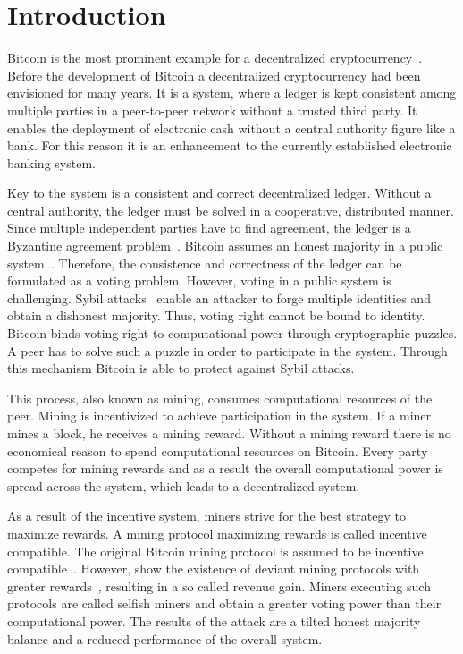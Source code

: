 \chapter{Introduction}\label{chap:introduction}
Bitcoin is the most prominent example for a decentralized cryptocurrency~\cite{1}. Before the development of Bitcoin a decentralized cryptocurrency had been envisioned for many years. It is a system, where a ledger is kept consistent among multiple parties in a peer-to-peer network without a trusted third party. It enables the deployment of electronic cash without a central authority figure like a bank.
For this reason it is an enhancement to the currently established electronic banking system.

Key to the system is a consistent and correct decentralized ledger. Without a central authority, the ledger must be solved in a cooperative, distributed manner.
Since multiple independent parties have to find agreement, the ledger is a Byzantine agreement problem~\cite{garay2015bitcoin}.
Bitcoin assumes an honest majority in a public system~\cite{tschorsch}. Therefore, the consistence and correctness of the ledger can be formulated as a voting problem. However, voting in a public system is challenging. Sybil attacks~\cite{sybil} enable an attacker to forge multiple identities and obtain a dishonest majority. Thus, voting right cannot be bound to identity. Bitcoin binds voting right to computational power through cryptographic puzzles. A peer has to solve such a puzzle in order to participate in the system. Through this mechanism Bitcoin is able to protect against Sybil attacks.

This process, also known as mining, consumes computational resources of the peer. Mining is incentivized to achieve participation in the system. If a miner mines a block, he receives a mining reward. Without a mining reward there is no economical reason to spend computational resources on Bitcoin. Every party competes for mining rewards and as a result the overall computational power is spread across the system, which leads to a decentralized system. 

As a result of the incentive system, miners strive for the best strategy to maximize rewards. A mining protocol maximizing rewards is called incentive compatible.  The original Bitcoin mining protocol is assumed to be incentive compatible~\cite{1}. However, \citeauthor{eyal} show the existence of deviant mining protocols with greater rewards~\cite{eyal}, resulting in a so called revenue gain. Miners executing such protocols are called selfish miners and obtain a greater voting power than their computational power. The results of the attack are a tilted honest majority balance and a reduced performance of the overall system.

